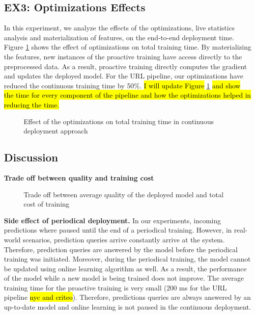 \subsection{EX3: Optimizations Effects}
In this experiment, we analyze the effects of the optimizations, live statistics analysis and materialization of features, on the end-to-end deployment time.
Figure \ref{optimization-effect} shows the effect of optimizations on total training time.
By materializing the features, new instances of the proactive training have access directly to the preprocessed data.
As a result, proactive training directly computes the gradient and updates the deployed model.
For the URL pipeline, our optimizations have reduced the continuous training time by 50\%.
\hl{I will update Figure} \ref{optimization-effect} \hl{and show the time for every component of the pipeline and how the optimizations helped in reducing the time.}
\begin{figure}[h!]
\centering
\resizebox{\columnwidth}{!}{}
\caption{Effect of the optimizations on total training time in continuous deployment approach}
\label{optimization-effect}
\end{figure}

\subsection{Discussion} \label{subsec:discussion}
\textbf{Trade off between quality and training cost}

\begin{figure}[!h]
\centering
\resizebox{\columnwidth}{!}{}
\caption{Trade off between average quality of the deployed model and total cost of training}
\label{sampling-method-figure}
\end{figure}

\textbf{Side effect of periodical deployment.}
In our experiments, incoming predictions where paused until the end of a periodical training.
However, in real-world scenarios, prediction queries arrive constantly arrive at the system.
Therefore, prediction queries are answered by the model before the periodical training was initiated. 
Moreover, during the periodical training, the model cannot be updated using online learning algorithm as well.
As a result, the performance of the model while a new model is being trained does not improve.
The average training time for the proactive training is very small (200 ms for the URL pipeline \hl{nyc and criteo}).
Therefore, predictions queries are always answered by an up-to-date model and online learning is not paused in the continuous deployment.



